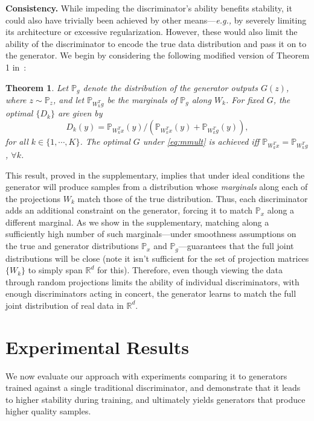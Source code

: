 \documentclass{article}
\newcommand{\R}{\mathbb{R}}
\newtheorem{theorem}{Theorem}[section]
\newcommand{\pz}{\mathbb{P}_{z}}
\newcommand{\px}{\mathbb{P}_{x}}
\newcommand{\pg}{\mathbb{P}_{g}}
\newcommand{\pwix}{\mathbb{P}_{W_k^Tx}}
\newcommand{\pwig}{\mathbb{P}_{W_k^Tg}}
\begin{document}
\textbf{Consistency.} While impeding the discriminator's ability benefits stability, it could also have trivially been achieved by other means---\emph{e.g.,} by severely limiting its architecture or excessive regularization. However, these would also limit the ability of the discriminator to encode the true data distribution and pass it on to the generator. We begin by considering the following modified version of  Theorem 1 in~\cite{goodfellow2014generative}:
\begin{theorem}\label{thm:const1}
  Let $\pg$ denote the distribution of the generator outputs $G(z)$, where $z \sim \pz$, and let $\pwig$ be the marginals of $\pg$ along $W_k$. For fixed $G$, the optimal $\{D_k\}$ are given by
  \begin{equation}
    D_k(y) = \pwix(y) / \left(\pwix(y) + \pwig(y)\right),
  \end{equation}
  for all $k \in \{1, \cdots, K\}$. The optimal $G$ under \eqref{eq:mmult} is achieved iff $\pwix =\pwig$, $\forall k$.
\end{theorem}
This  result, proved in the supplementary, implies that under ideal conditions %
the generator will produce samples from a distribution whose \emph{marginals} along each of the projections $W_k$ match those of the true distribution. Thus, each discriminator adds an additional constraint on the generator, forcing it to match $\px$ along a different marginal. As we show in the supplementary, matching along a sufficiently high number of such marginals---under smoothness assumptions on the true and generator distributions $\px$ and $\pg$---guarantees that the full joint distributions will be close (note it isn't sufficient for the set of projection matrices $\{W_k\}$ to simply span $\R^d$ for this). Therefore, even though viewing the data through random projections limits the ability of individual discriminators, with enough discriminators acting in concert, the generator learns to match the full joint distribution of real data in $\R^d$.

\section{Experimental Results}
\label{sec:experiments}

We now evaluate our approach with experiments comparing it to generators trained against a single traditional discriminator, and demonstrate that it leads to higher stability during training, and ultimately yields generators that produce higher quality samples.
\end{document}
